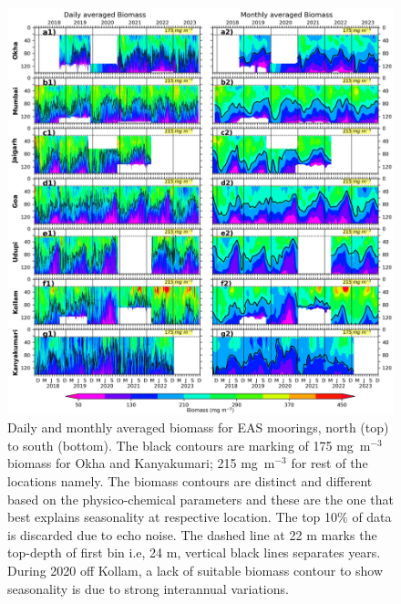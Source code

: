 \documentclass[authoryear,review,12pt]{elsarticle}
\begin{document}
\begin{figure}[htbp]
	\centering
	\includegraphics[width=\textwidth]{./figures/biomass_daily_monthly.jpeg} 
	\captionsetup{justification=justified,font=footnotesize,skip=0.05\baselineskip,width=\textwidth}
	\caption{Daily and monthly averaged biomass for EAS moorings, north (top) to south (bottom). The black contours are marking of 175 mg~m$^{-3}$ biomass for Okha and Kanyakumari; 215 mg~m$^{-3}$  for rest of the locations namely. The biomass contours are distinct and different based on the physico-chemical parameters and these are the one that best explains seasonality at respective location.  The top 10\% of data is discarded due to echo noise. The dashed line at 22 m marks the top-depth of first bin i.e, 24 m, vertical black lines separates years. During 2020 off Kollam, a lack of suitable biomass contour to show seasonality is due to strong interannual variations.}
	\label{fig:dailynmonthly}
\end{figure}
\end{document}

